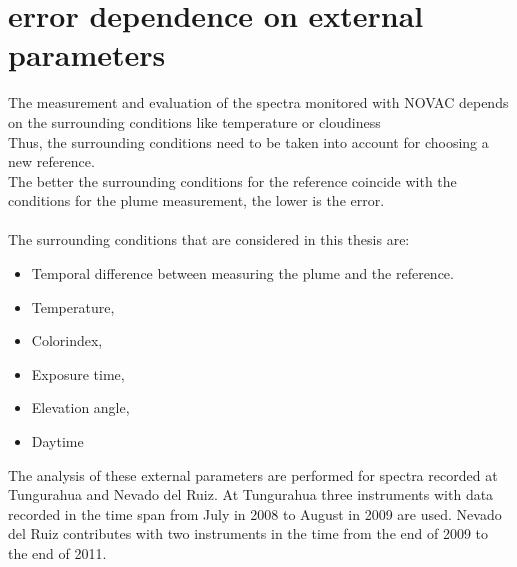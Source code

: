 \section{ error dependence on external parameters \label{Chap:BROErr}}
The measurement and evaluation of the spectra monitored with NOVAC depends on the surrounding conditions like temperature or cloudiness \citep{lubcke2014optical}\\
Thus, the surrounding conditions need to be taken into account for choosing a new reference.\\
The better the surrounding conditions for the reference coincide with the conditions for the plume measurement, the lower is the  error. \\
	\\
The surrounding conditions that are considered in this thesis are: 
	\begin{itemize}
		\item Temporal difference between measuring the plume and the reference.
		\item Temperature, 
		\item Colorindex, 
		\item Exposure time, 
		\item Elevation angle, 
		\item Daytime 	
	\end{itemize}
The analysis of these external parameters are performed for spectra recorded at Tungurahua and Nevado del Ruiz. At Tungurahua three instruments with data recorded in the time span from July in 2008 to August in 2009 are used. Nevado del Ruiz contributes with two instruments in the time from the end of 2009 to the end of 2011.
%	
